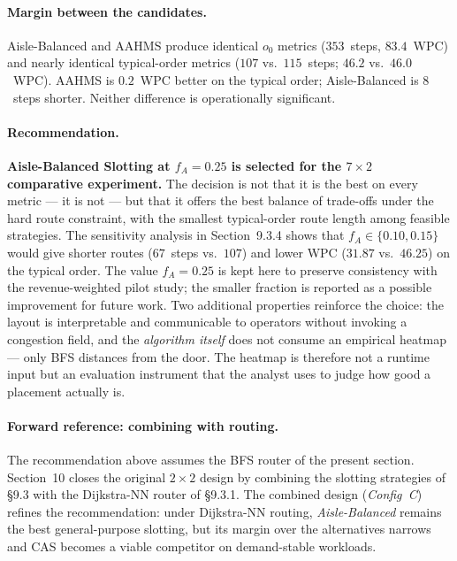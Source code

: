 \documentclass[12pt,a4paper]{article}
\begin{document}
\paragraph{Margin between the candidates.}
Aisle-Balanced and AAHMS produce identical $o_0$ metrics ($353$~steps,
$83.4$~WPC) and nearly identical typical-order metrics ($107$ vs.\ $115$~steps;
$46.2$ vs.\ $46.0$~WPC).
AAHMS is $0.2$~WPC better on the typical order; Aisle-Balanced is $8$~steps
shorter.
Neither difference is operationally significant.

\paragraph{Recommendation.}
\textbf{Aisle-Balanced Slotting at $f_A = 0.25$ is selected for the
$7 \times 2$ comparative experiment.}
The decision is not that it is the best on every metric --- it is not ---
but that it offers the best balance of trade-offs under the hard route
constraint, with the smallest typical-order route length among feasible
strategies. The sensitivity analysis in Section~9.3.4 shows that
$f_A \in \{0.10, 0.15\}$ would give shorter routes ($67$~steps vs.\ $107$)
and lower WPC ($31.87$ vs.\ $46.25$) on the typical order. The value
$f_A = 0.25$ is kept here to preserve consistency with the revenue-weighted
pilot study; the smaller fraction is reported as a possible improvement
for future work.
Two additional properties reinforce the choice: the layout is interpretable
and communicable to operators without invoking a congestion field, and the
\emph{algorithm itself} does not consume an empirical heatmap --- only BFS
distances from the door.
The heatmap is therefore not a runtime input but an evaluation instrument
that the analyst uses to judge how good a placement actually is.

\paragraph{Forward reference: combining with routing.}
The recommendation above assumes the BFS router of the present section.
Section~10 closes the original $2 \times 2$ design by combining the
slotting strategies of §9.3 with the Dijkstra-NN router of §9.3.1.
The combined design (\emph{Config~C}) refines the recommendation:
under Dijkstra-NN routing, \emph{Aisle-Balanced} remains the best
general-purpose slotting, but its margin over the alternatives narrows
and CAS becomes a viable competitor on demand-stable workloads.
\end{document}
